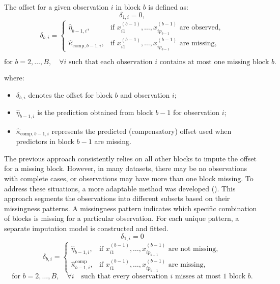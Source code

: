 The offset for a given observation \( i \) in block \( b \) is defined as:
\[
\delta_{1,i} = 0,
\]
\begin{equation*}
\delta_{b,i} =
\begin{cases} 
    \hat{\eta}_{b-1,i}, & \text{if } x^{(b-1)}_{i1}, \dots, x^{(b-1)}_{ip_{b-1}} \text{ are observed}, \\
    \hat{\kappa}_{\text{comp},b-1,i}, & \text{if } x^{(b-1)}_{i1}, \dots, x^{(b-1)}_{ip_{b-1}} \text{ are missing},
\end{cases}
\end{equation*}

\begin{equation*}
\text{for } b = 2, \dots, B, \quad \forall i \text{ such that each observation } i 
\text{ contains at most one missing block } b.
\end{equation*}

where:
\begin{itemize}
    \item \(\delta_{b,i}\) denotes the offset for block \( b \) and observation \( i \);
    \item \(\hat{\eta}_{b-1,i}\) is the prediction obtained from block \( b-1 \) for observation \( i \);
    \item \(\hat{\kappa}_{\text{comp},b-1,i}\) represents the predicted (compensatory) offset 
    used when predictors in block \( b-1 \) are missing.
\end{itemize}

The previous approach consistently relies on all other blocks to impute the offset for a missing block. However, in many datasets, there may be no observations with complete cases, or observations may have more than one block missing. To address these situations, a more adaptable method was developed (). This approach segments the observations into different subsets based on their missingness patterns. A missingness pattern indicates which specific combination of blocks is missing for a particular observation. For each unique pattern, a separate imputation model is constructed and fitted.
\[
\delta_{1,i} = 0
\]
\[
\delta_{b,i} =
\begin{cases} 
    \hat{\eta}_{b-1,i}, & \text{if } x^{(b-1)}_{i1}, \dots, x^{(b-1)}_{ip_{b-1}} \text{ are not missing}, \\
    \hat{\kappa}^{\text{comp}}_{b-1,i}, & \text{if } x^{(b-1)}_{i1}, \dots, x^{(b-1)}_{ip_{b-1}} \text{ are missing},
\end{cases}
\]
\[
\text{for } b = 2, \dots, B, \quad \forall i \quad \text{such that every observation } i \text{ misses at most 1 block } b.
\]

